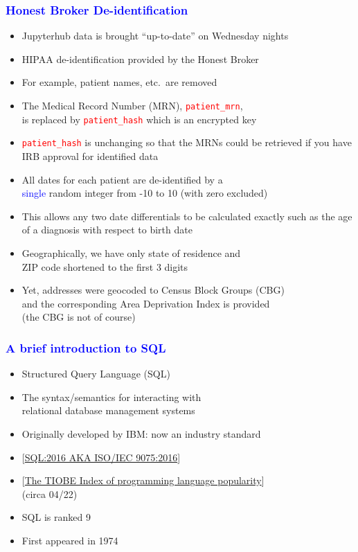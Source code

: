 \documentclass[11pt,pdftex,dvipsnames,usenames]{beamer}
\begin{document}
\begin{frame}[fragile]\frametitle{\bf\textcolor{blue}{Honest Broker De-identification}}

\begin{itemize}
\item Jupyterhub data is brought ``up-to-date'' on Wednesday nights
\item HIPAA de-identification provided by the Honest Broker
\item For example, patient names, etc.\ are removed
\item The Medical Record Number (MRN),
  \textcolor{red}{\texttt{patient\_mrn}},\\ is replaced by 
  \textcolor{red}{\texttt{patient\_hash}} which is an encrypted
  key
\item \textcolor{red}{\texttt{patient\_hash}} is unchanging so that
the MRNs could be retrieved if you have IRB approval for identified
data
\item All dates for each patient are de-identified by a\\
\textcolor{blue}{single} random integer from -10 to 10 (with zero excluded)
\item This allows any two date differentials to be calculated
exactly such as the age of a diagnosis with respect to birth date
\item Geographically, we have only state of residence and\\
ZIP code shortened to the first 3 digits 
\item Yet, addresses were geocoded to Census Block Groups (CBG)\\ 
and the corresponding Area Deprivation Index is provided\\
(the CBG is not of course)
\end{itemize}

\end{frame}


\begin{frame}[fragile]\frametitle{\bf\textcolor{blue}{A brief introduction to SQL}}

\begin{itemize}
\item Structured Query Language (SQL) 
\item The syntax/semantics for interacting with\\
relational database management systems
\item Originally developed by IBM: now an industry standard
\item \textcolor{PineGreen}{[\href{https://www.iso.org/standard/63555.html}
{SQL:2016 AKA ISO/IEC 9075:2016}]}
\item \textcolor{PineGreen}{[\href{https://www.tiobe.com/tiobe-index}
{The TIOBE Index of programming language popularity}]}\\ (circa 04/22)
\item SQL is ranked 9
\item First appeared in 1974
\end{itemize}

\end{frame}
\end{document}
